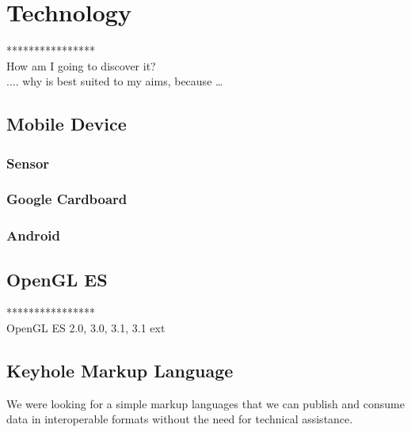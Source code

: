 \label{chapter-technology}
\chapter{Technology}

****************\\
How am I going to discover it?\\
.... why is best suited to my aims, because …\\

\section{Mobile Device}

\subsection{Sensor}

\subsection{Google Cardboard}

\subsection{Android}

\section{OpenGL ES}

****************\\
OpenGL ES 2.0, 3.0,  3.1, 3.1 ext\\

\section{Keyhole Markup Language}

We were looking for a simple markup languages that we can publish and consume data  in interoperable formats without the need for technical assistance.

